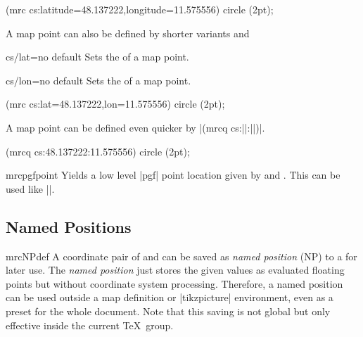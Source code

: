 \begin{dispListing}
  \fill (mrc cs:latitude=48.137222,longitude=11.575556) circle (2pt);
\end{dispListing}

\medskip
A map point can also be defined by shorter variants
 and 

\begin{docMrcKey}{cs/lat}{=}{no default}
  Sets the  of a map point.
\end{docMrcKey}

\begin{docMrcKey}{cs/lon}{=}{no default}
  Sets the  of a map point.
\end{docMrcKey}

\begin{dispListing}
  \fill (mrc cs:lat=48.137222,lon=11.575556) circle (2pt);
\end{dispListing}

\medskip
A map point can be defined even quicker by
|(mrcq cs:||:||)|.

\begin{dispListing}
  \fill (mrcq cs:48.137222:11.575556) circle (2pt);
\end{dispListing}

\medskip

\begin{docCommand}{mrcpgfpoint}{}
  Yields a low level |pgf| point location given by
   and .
  This can be used like |\pgfpoint|.
  \begin{dispListing}
  \end{dispListing}
\end{docCommand}




\clearpage
\subsection{Named Positions}\label{sec:names_positions}


\begin{docCommand}{mrcNPdef}{}
  A coordinate pair of  and 
  can be saved as \emph{named position} (NP) to a  for later use.
  The \emph{named position} just stores the given values as evaluated
  floating points but without coordinate system processing.
  Therefore, a named position can be used outside a map definition
  or |tikzpicture| environment, even as a preset for the whole document.
  Note that this saving is not global but only effective inside the
  current \TeX\ group.
  \begin{dispListing}
  \end{dispListing}
\end{docCommand}


